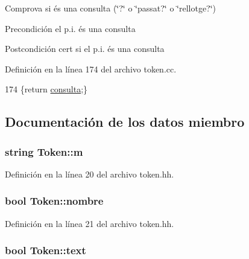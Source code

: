 Comprova si és una consulta (\char`\"{}?\char`\"{} o \char`\"{}passat?\char`\"{} o \char`\"{}rellotge?\char`\"{}) 

\begin{DoxyPrecond}{Precondición}
el p.\-i. és una consulta 
\end{DoxyPrecond}
\begin{DoxyPostcond}{Postcondición}
cert si el p.\-i. és una consulta 
\end{DoxyPostcond}


Definición en la línea 174 del archivo token.\-cc.


\begin{DoxyCode}
174 \{\textcolor{keywordflow}{return} \hyperlink{class_token_a4479e876476db5ccd360ad3906d47eff}{consulta};\}
\end{DoxyCode}


\subsection{Documentación de los datos miembro}
\hypertarget{class_token_a7ebc9777007c54f9a83d6197f3023d07}{
\subsubsection[{m}]{\setlength{\rightskip}{0pt plus 5cm}string Token\-::m\hspace{0.3cm}{\ttfamily [private]}}}\label{class_token_a7ebc9777007c54f9a83d6197f3023d07}


Definición en la línea 20 del archivo token.\-hh.

\hypertarget{class_token_a3f8dba2b14d4e7b8d77ea608c286e62f}{
\subsubsection[{nombre}]{\setlength{\rightskip}{0pt plus 5cm}bool Token\-::nombre\hspace{0.3cm}{\ttfamily [private]}}}\label{class_token_a3f8dba2b14d4e7b8d77ea608c286e62f}


Definición en la línea 21 del archivo token.\-hh.

\hypertarget{class_token_ad1f7addc8379df272399a71189a3d234}{
\subsubsection[{text}]{\setlength{\rightskip}{0pt plus 5cm}bool Token\-::text\hspace{0.3cm}{\ttfamily [private]}}}\label{class_token_ad1f7addc8379df272399a71189a3d234}


